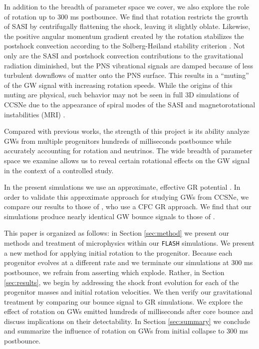 \documentclass[twocolumn,times]{aastex62}  %
\begin{document}
In addition to the breadth of parameter space we cover, we also explore the role of rotation up to 300 ms postbounce.  
We find that rotation restricts the growth of SASI by centrifugally flattening the shock, leaving it slightly oblate. Likewise, the positive angular momentum gradient created by the rotation stabilizes the postshock convection according to the Solberg-H{\o}iland stability criterion \citep{endal:1978,fryer:2000}.  Not only are the SASI and postshock convection contributions to the gravitational radiation diminished, but the PNS vibrational signals are damped because of less turbulent downflows of matter onto the PNS surface.  
This results in a ``muting'' of the GW signal with increasing rotation speeds.
While the origins of this muting are physical, such behavior may not be seen in full 3D simulations of CCSNe due to the appearance of spiral modes of the SASI and magnetorotational instabilities (MRI) \citep{cerda-duran:2007,andresen:2018} . 

Compared with previous works, the strength of this project is its ability analyze GWs from multiple progenitors hundreds of milliseconds postbounce while accurately accounting for rotation and neutrinos.  The wide breadth of parameter space we examine allows us to reveal certain rotational effects on the GW signal in the context of a controlled study.

In the present simulations we use an approximate, effective GR potential \citep{marek:2006,oconnor:2018}.
In order to validate this approximate approach for studying GWs from CCSNe, we compare our results to those of \citet{richers:2017}, who use a CFC GR approach.  We find that our simulations produce nearly identical GW bounce signals to those of \citet{richers:2017}.  

This paper is organized as follows:  in Section \ref{sec:method} we present our methods and treatment of microphysics within our \texttt{FLASH} simulations.  We present a new method for applying initial rotation to the progenitor.  Because each progenitor evolves at a different rate and we terminate our simulations at 300 ms postbounce, we refrain from asserting which explode.  Rather, in Section \ref{sec:results}, we begin by addressing the shock front evolution for each of the progenitor masses and initial rotation velocities.  We then verify our gravitational treatment by comparing our bounce signal to GR simulations.  We explore the effect of rotation on GWs emitted hundreds of milliseconds after core bounce and discuss implications on their detectability.  In Section \ref{sec:summary} we conclude and summarize the influence of rotation on GWs from initial collapse to 300 ms postbounce. 
\end{document}

